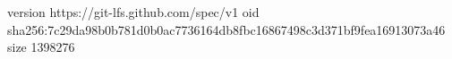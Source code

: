 version https://git-lfs.github.com/spec/v1
oid sha256:7c29da98b0b781d0b0ac7736164db8fbc16867498c3d371bf9fea16913073a46
size 1398276
